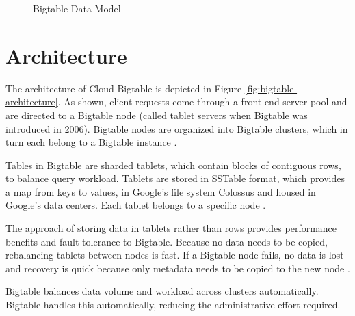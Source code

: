 \documentclass[9pt,twocolumn,twoside]{../../styles/osajnl}
\begin{document}
\begin{figure}[htbp]
\centering
{}
\caption{Bigtable Data Model \cite{www-bigtabledocoverview}}
\label{fig:bigtable-datamodel}
\end{figure}

\section{Architecture}

The architecture of Cloud Bigtable is depicted in Figure \ref{fig:bigtable-architecture}.  As shown, client requests come through a front-end server pool and are directed to a Bigtable node (called tablet servers when Bigtable was introduced in 2006). Bigtable nodes are organized into Bigtable clusters, which in turn each belong to a Bigtable instance \cite{www-bigtabledocoverview}.

Tables in Bigtable are sharded tablets, which contain blocks of contiguous rows, to balance query workload. Tablets are stored in SSTable format, which provides a map from keys to values, in Google's file system Colossus and housed in Google's data centers. Each tablet belongs to a specific node \cite{www-bigtabledocoverview}.

The approach of storing data in tablets rather than rows provides performance benefits and fault tolerance to Bigtable. Because no data needs to be copied, rebalancing tablets between nodes is fast. If a Bigtable node fails, no data is lost and recovery is quick because only metadata needs to be copied to the new node  \cite{www-bigtabledocoverview}.

Bigtable balances data volume and workload across clusters automatically. Bigtable handles this automatically, reducing the administrative effort required\cite{www-bigtabledocoverview}.


\end{document}
